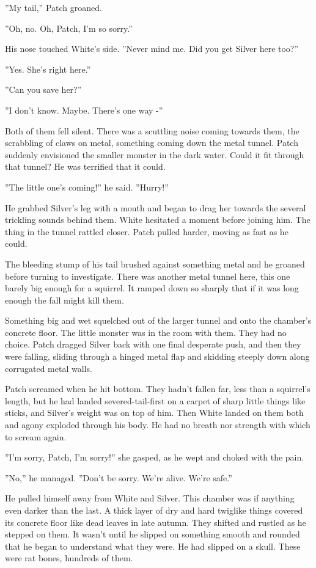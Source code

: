 \documentclass[11pt]{article}
\begin{document}
 ''My tail,'' Patch groaned.\par
 ''Oh, no. Oh, Patch, I'm so sorry.''\par
 His nose touched White's side. ''Never mind me. Did you get Silver here too?''\par
 ''Yes. She's right here.''\par
 ''Can you save her?''\par
 ''I don't know. Maybe. There's one way -''\par
 Both of them fell silent. There was a scuttling noise coming towards them, the scrabbling of claws on metal, something coming down the metal tunnel. Patch suddenly envisioned the smaller monster in the dark water. Could it fit through that tunnel? He was terrified that it could.\par
 ''The little one's coming!'' he said. ''Hurry!''\par
 He grabbed Silver's leg with a mouth and began to drag her towards the several trickling sounds behind them. White hesitated a moment before joining him. The thing in the tunnel rattled closer. Patch pulled harder, moving as fast as he could.\par
The bleeding stump of his tail brushed against something metal and he groaned before turning to investigate. There was another metal tunnel here, this one barely big enough for a squirrel. It ramped down so sharply that if it was long enough the fall might kill them.\par
Something big and wet squelched out of the larger tunnel and onto the chamber's concrete floor. The little monster was in the room with them. They had no choice. Patch dragged Silver back with one final desperate push, and then they were falling, sliding through a hinged metal flap and skidding steeply down along corrugated metal walls.\par
Patch screamed when he hit bottom. They hadn't fallen far, less than a squirrel's length, but he had landed severed-tail-first on a carpet of sharp little things like sticks, and Silver's weight was on top of him. Then White landed on them both and agony exploded through his body. He had no breath nor strength with which to scream again.\par
''I'm sorry, Patch, I'm sorry!'' she gasped, as he wept and choked with the pain.\par
''No,'' he managed. ''Don't be sorry. We're alive. We're safe.''\par
He pulled himself away from White and Silver. This chamber was if anything even darker than the last. A thick layer of dry and hard twiglike things covered its concrete floor like dead leaves in late autumn. They shifted and rustled as he stepped on them. It wasn't until he slipped on something smooth and rounded that he began to understand what they were. He had slipped on a skull. These were rat bones, hundreds of them.\par
\end{document}
